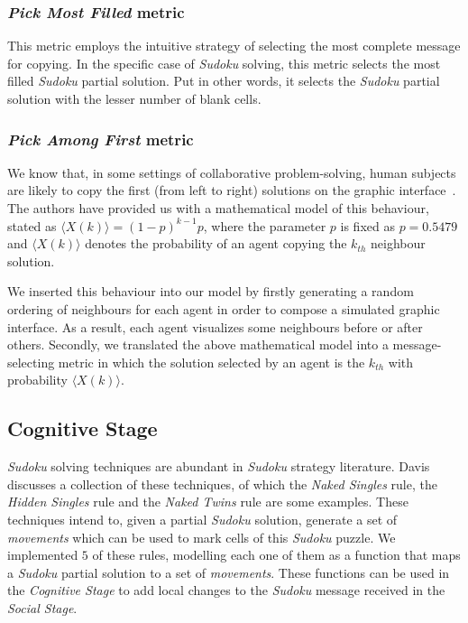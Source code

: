\documentclass{article}
\begin{document}
\subsubsection{{\em Pick Most Filled} metric}

This metric employs the intuitive strategy of selecting the most complete message for copying. In the specific case of {\em Sudoku} solving, this metric selects the most filled {\em Sudoku} partial solution. Put in other words, it selects the {\em Sudoku} partial solution with the lesser number of blank cells.

\subsubsection{{\em Pick Among First} metric}

We know that, in some settings of collaborative problem-solving, human subjects are likely to copy the first (from left to right) solutions on the graphic interface~\cite{farenzena:collabem}. The authors have provided us with a mathematical model of this behaviour, stated as $\langle X(k)\rangle = (1-p)^{k-1}p$, where the parameter $p$ is fixed as $p = 0.5479$ and $\langle X(k)\rangle$ denotes the probability of an agent copying the $k_{th}$ neighbour solution.

We inserted this behaviour into our model by firstly generating a random ordering of neighbours for each agent in order to compose a simulated graphic interface. As a result, each agent visualizes some neighbours before or after others. Secondly, we translated the above mathematical model into a message-selecting metric in which the solution selected by an agent is the $k_{th}$ with probability $\langle X(k)\rangle$.

\subsection{Cognitive Stage}

{\em Sudoku} solving techniques are abundant in {\em Sudoku} strategy literature. Davis ~\cite{davis:mathsudoku} discusses a collection of these techniques, of which the {\em Naked Singles} rule, the {\em Hidden Singles} rule and the {\em Naked Twins} rule are some examples. These techniques intend to, given a partial {\em Sudoku} solution, generate a set of {\em movements} which can be used to mark cells of this {\em Sudoku} puzzle. We implemented $5$ of these rules, modelling each one of them as a function that maps a {\em Sudoku} partial solution to a set of {\em movements}. These functions can be used in the {\em Cognitive Stage} to add local changes to the {\em Sudoku} message received in the {\em Social Stage}.
\end{document}
